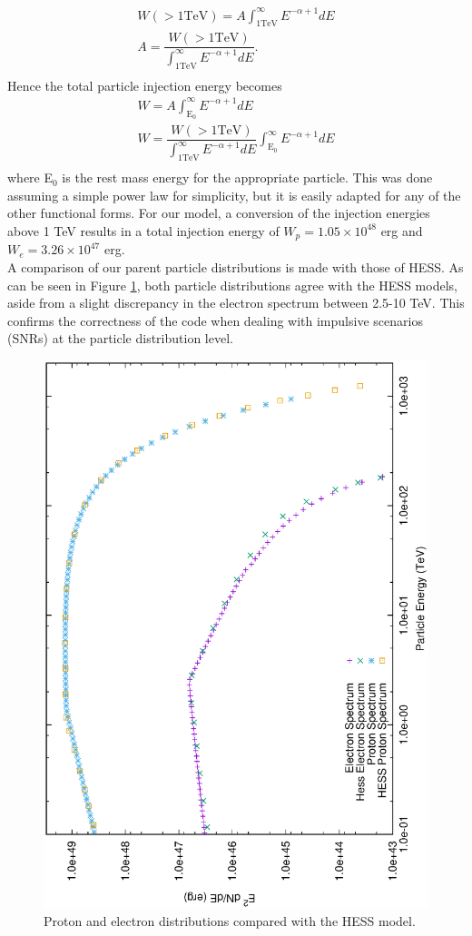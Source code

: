 \documentclass[12pt,a4paper]{article}
\begin{document}
\begin{equation*}
\begin{split}
W\mathrm{(>1TeV)} = A\int_{1 \mathrm{TeV}}^{\infty}  E^{-\alpha + 1} dE\\
A = \dfrac{W\mathrm{(>1TeV)}}{\int_{1 \mathrm{TeV}}^{\infty}  E^{-\alpha + 1} dE}.\\
\end{split}
\end{equation*}
Hence the total particle injection energy becomes
\begin{equation} \label{eq:renormal}
\begin{split}
W = A\int_{\mathrm{E_0}}^{\infty}  E^{-\alpha + 1} dE\\
W = \dfrac{W\mathrm{(>1TeV)}}{\int_{1 \mathrm{TeV}}^{\infty}  E^{-\alpha + 1} dE}\int_{\mathrm{E_0}}^{\infty}  E^{-\alpha + 1} dE\\
\end{split}
\end{equation}
where E$_0$ is the rest mass energy for the appropriate particle. This was done assuming a simple power law for simplicity, but it is easily adapted for any of the other functional forms. For our model, a conversion of the injection energies above 1 TeV results in a total injection energy of $W_p = 1.05 \times 10^{48}$ erg and $W_e  = 3.26 \times 10^{47}$ erg. \\

A comparison of our parent particle distributions is made with those of HESS. As can be seen in Figure \ref{fig:rxj1713spectrumboth}, both particle distributions agree with the HESS models, aside from a slight discrepancy in the electron spectrum between 2.5-10 TeV. This confirms the correctness of the code when dealing with impulsive scenarios (SNRs) at the particle distribution level.
\begin{figure}[H]
	\centering
	\includegraphics[width=0.52\linewidth, height=0.4\textheight, angle=-90]{rxj1713_spectrum_both.ps}
	\caption{Proton and electron distributions compared with the HESS model.}
	\label{fig:rxj1713spectrumboth}
\end{figure}
\end{document}
